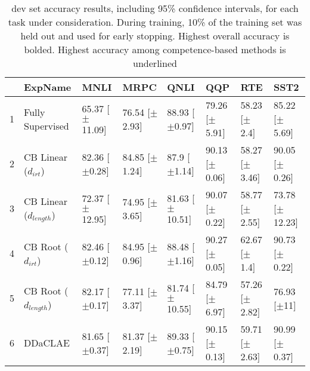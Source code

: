 \begin{table*}[ht]
\centering
\begingroup\small
\begin{tabular}{rlllllll}
  \toprule
 & ExpName & MNLI & MRPC & QNLI & QQP & RTE & SST2 \\ 
  \midrule
1 & Fully Supervised & 65.37 [$\pm$11.09] & 76.54 [$\pm$2.93] & 88.93 [$\pm$0.97] & 79.26 [$\pm$5.91] & 58.23 [$\pm$2.4] & 85.22 [$\pm$5.69] \\ 
  2 & CB Linear ($d_{irt}$) & 82.36 [$\pm$0.28] & 84.85 [$\pm$1.24] & 87.9 [$\pm$1.14] & 90.13 [$\pm$0.06] & 58.27 [$\pm$3.46] & 90.05 [$\pm$0.26] \\ 
  3 & CB Linear ($d_{length}$) & 72.37 [$\pm$12.95] & 74.95 [$\pm$3.65] & 81.63 [$\pm$10.51] & 90.07 [$\pm$0.22] & 58.77 [$\pm$2.55] & 73.78 [$\pm$12.23] \\ 
  4 & CB Root ($d_{irt}$) & 82.46 [$\pm$0.12] & 84.95 [$\pm$0.96] & 88.48 [$\pm$1.16] & 90.27 [$\pm$0.05] & 62.67 [$\pm$1.4] & 90.73 [$\pm$0.22] \\ 
  5 & CB Root ($d_{length}$) & 82.17 [$\pm$0.17] & 77.11 [$\pm$3.37] & 81.74 [$\pm$10.55] & 84.79 [$\pm$6.97] & 57.26 [$\pm$2.82] & 76.93 [$\pm$11] \\ 
  6 & DDaCLAE & 81.65 [$\pm$0.37] & 81.37 [$\pm$2.19] & 89.33 [$\pm$0.75] & 90.15 [$\pm$0.13] & 59.71 [$\pm$2.63] & 90.99 [$\pm$0.37] \\ 
   \bottomrule
\end{tabular}
\endgroup
\caption{dev set accuracy results, including 95\% confidence intervals, for each task under consideration. During training, 10\% of the training set was held out and used for early stopping. Highest overall accuracy is bolded. Highest accuracy among competence-based methods is underlined} 
\label{tab:acc_bert-True}
\end{table*}
